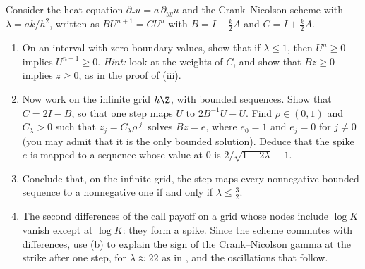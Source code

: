 \begin{exercise}\label{ex:num-cn-positivity}
\medium Consider the heat equation $\partial_\tau u=a\,\partial_{yy}u$ and the Crank--Nicolson scheme
with $\lambda=ak/h^2$, written as $BU^{n+1}=CU^n$ with $B=I-\frac k2A$ and $C=I+\frac k2A$.
\begin{enumerate}[label=(\alph*)]
  \item On an interval with zero boundary values, show that if $\lambda\le1$, then $U^n\ge0$ implies
    $U^{n+1}\ge0$. \emph{Hint:} look at the weights of $C$, and show that $Bz\ge0$ implies $z\ge0$, as
    in the proof of (iii).
  \item Now work on the infinite grid $h\Z$, with bounded sequences. Show that $C=2I-B$, so that one
    step maps $U$ to $2B^{-1}U-U$. Find $\rho\in(0,1)$ and $C_\lambda>0$ such that $z_j=C_\lambda\rho^{|j|}$
    solves $Bz=e$, where $e_0=1$ and $e_j=0$ for $j\ne0$ (you may admit that it is the only bounded
    solution). Deduce that the spike $e$ is mapped to a sequence whose value at $0$ is
    $2/\sqrt{1+2\lambda}-1$.
  \item Conclude that, on the infinite grid, the step maps every nonnegative bounded sequence to a
    nonnegative one if and only if $\lambda\le\frac32$.
  \item The second differences of the call payoff on a grid whose nodes include $\log K$ vanish
    except at $\log K$: they form a spike. Since the scheme commutes with differences, use (b) to
    explain the sign of the Crank--Nicolson gamma at the strike after one step, for
    $\lambda\approx22$ as in , and the oscillations that follow.
\end{enumerate}
\end{exercise}

